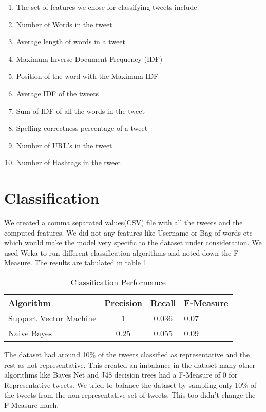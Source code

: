 \begin{enumerate}
\item The set of features we chose for classifying tweets include
\item Number of Words in the tweet
\item Average length of words in a tweet
\item Maximum Inverse Document Frequency (IDF)
\item Position of the word with the Maximum IDF
\item Average IDF of the tweets
\item Sum of IDF of all the words in the tweet
\item Spelling correctness percentage of  a tweet
\item Number of URL’s in the tweet
\item Number of Hashtags in the tweet
\end{enumerate}

\section{Classification}
We created a comma separated values(CSV) file with all the tweets and the computed features. We did not any features like Username or Bag of words etc which would make the model very specific to the dataset under consideration. We used Weka to run different classification algorithms and noted down the F-Measure. The results are tabulated in table \ref{tab:one}


\begin{table}
\caption{Classification Performance}
\label{tab:one}
\begin{center}
\begin{tabular}{lccl}
\toprule
Algorithm & Precision & Recall & F-Measure\\
\midrule
Support Vector Machine & 1 & 0.036 & 0.07\\
Naive  Bayes  & 0.25 & 0.055 & 0.09\\
\bottomrule
\end{tabular}
\end{center}
\end{table}


The dataset had around 10\% of the tweets classified as representative and the rest as not representative. This created an imbalance in the dataset many other algorithms like Bayes Net and J48 decision trees had a F-Measure of 0 for Representative tweets. We tried to balance the dataset by sampling only 10\% of the tweets from the non representative set of tweets. This too didn't change the F-Measure much. 

